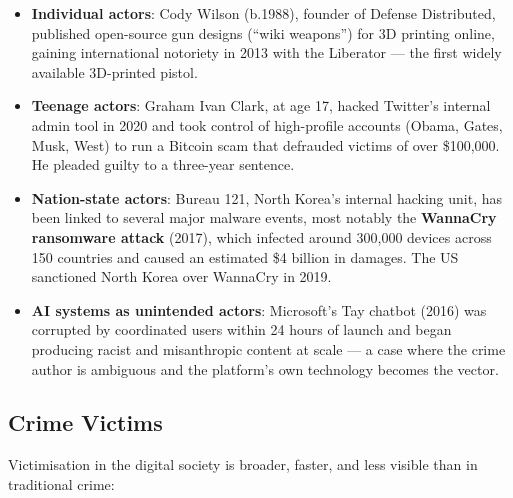 \documentclass[11pt,a4paper,openany]{report}
\theoremstyle{definition}
\theoremstyle{plain}
\theoremstyle{remark}
\begin{document}
\begin{itemize}
    \item \textbf{Individual actors}: Cody Wilson (b.\@ 1988), founder of Defense Distributed, published open-source gun designs (``wiki weapons'') for 3D printing online, gaining international notoriety in 2013 with the Liberator --- the first widely available 3D-printed pistol.
    \item \textbf{Teenage actors}: Graham Ivan Clark, at age 17, hacked Twitter's internal admin tool in 2020 and took control of high-profile accounts (Obama, Gates, Musk, West) to run a Bitcoin scam that defrauded victims of over \$100,000. He pleaded guilty to a three-year sentence.
    \item \textbf{Nation-state actors}: Bureau 121, North Korea's internal hacking unit, has been linked to several major malware events, most notably the \textbf{WannaCry ransomware attack} (2017), which infected around 300,000 devices across 150 countries and caused an estimated \$4 billion in damages. The US sanctioned North Korea over WannaCry in 2019.
    \item \textbf{AI systems as unintended actors}: Microsoft's Tay chatbot (2016) was corrupted by coordinated users within 24 hours of launch and began producing racist and misanthropic content at scale --- a case where the crime author is ambiguous and the platform's own technology becomes the vector.
\end{itemize}

\subsection{Crime Victims}

Victimisation in the digital society is broader, faster, and less visible than in traditional crime:
\end{document}
